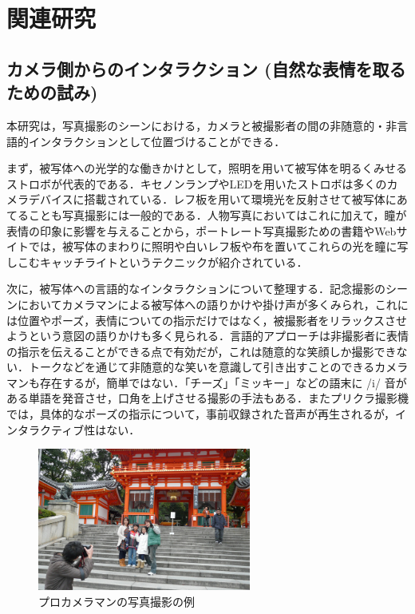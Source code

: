 \documentclass[submit,techreq]{ec2014}
\begin{document}
\section{関連研究}
\subsection{カメラ側からのインタラクション (自然な表情を取るための試み)}
本研究は，写真撮影のシーンにおける，カメラと被撮影者の間の非随意的・非言語的インタラクションとして位置づけることができる．

まず，被写体への光学的な働きかけとして，照明を用いて被写体を明るくみせるストロボが代表的である．キセノンランプやLEDを用いたストロボは多くのカメラデバイスに搭載されている．レフ板を用いて環境光を反射させて被写体にあてることも写真撮影には一般的である．人物写真においてはこれに加えて，瞳が表情の印象に影響を与えることから，ポートレート写真撮影ための書籍やWebサイトでは，被写体のまわりに照明や白いレフ板や布を置いてこれらの光を瞳に写しこむキャッチライトというテクニックが紹介されている．

次に，被写体への言語的なインタラクションについて整理する．記念撮影のシーンにおいてカメラマンによる被写体への語りかけや掛け声が多くみられ，これには位置やポーズ，表情についての指示だけではなく，被撮影者をリラックスさせようという意図の語りかけも多く見られる．言語的アプローチは非撮影者に表情の指示を伝えることができる点で有効だが，これは随意的な笑顔しか撮影できない．トークなどを通じて非随意的な笑いを意識して引き出すことのできるカメラマンも存在するが，簡単ではない．「チーズ」「ミッキー」などの語末に /i/ 音がある単語を発音させ，口角を上げさせる撮影の手法もある．またプリクラ撮影機では，具体的なポーズの指示について，事前収録された音声が再生されるが，インタラクティブ性はない．

\begin{figure}[h!]
  \centering  
\includegraphics[width=70mm, bb=0 0 680 455]{images/murataphoto-main.jpg}
\caption{プロカメラマンの写真撮影の例}
  \label{recursive}
\end{figure}
\end{document}
